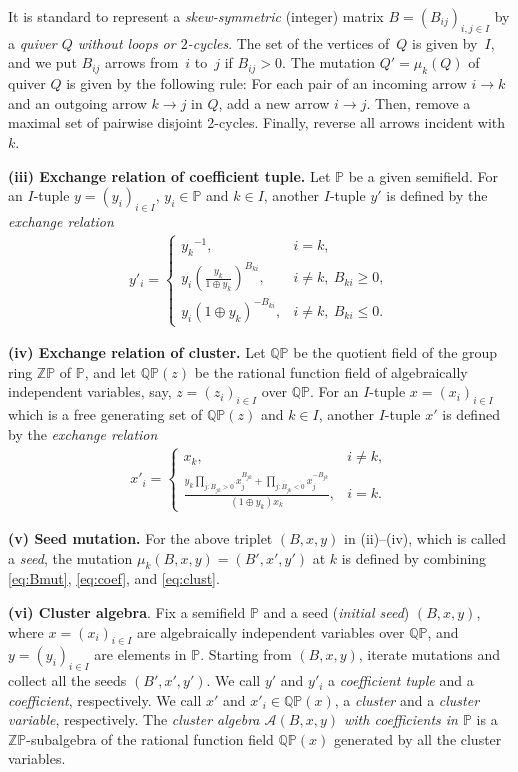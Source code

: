 \documentclass[pdftex]{sigma}
\numberwithin{equation}{section}
\theoremstyle{definition}
\begin{document}
It is standard to represent
a {\em skew-symmetric} (integer) matrix $B=(B_{ij})_{i,j\in I}$
by a {\em quiver $Q$
without loops or $2$-cycles}.
The set of the vertices of~$Q$ is given by~$I$,
and we put $B_{ij}$ arrows from~$i$ to~$j$
if $B_{ij}>0$.
The mutation $Q'=\mu_k(Q)$ of quiver $Q$ is given by the following
rule:
For each pair of an incoming arrow $i\rightarrow k$
and an outgoing arrow $k\rightarrow j$ in $Q$,
add a new arrow $i\rightarrow j$.
Then, remove a maximal set of pairwise disjoint 2-cycles.
Finally, reverse all arrows incident with $k$.

{\bf (iii)  Exchange relation of coef\/f\/icient tuple.}
Let $\mathbb{P}$ be a given semif\/ield.
For an $I$-tuple $y=(y_i)_{i\in I}$, $y_i\in \mathbb{P}$
and $k\in I$, another $I$-tuple $y'$ is def\/ined
by the {\em exchange relation}
\begin{gather}
\label{eq:coef}
y'_i =
\begin{cases}
\displaystyle
{y_k}{}^{-1}, &i=k,\\
\displaystyle
y_i \left(\frac{y_k}{1\oplus {y_k}}\right)^{B_{ki}},&
i\neq k,\ B_{ki}\geq 0,\\
y_i (1\oplus y_k)^{-B_{ki}},&
i\neq k,\ B_{ki}\leq 0.
\end{cases}
\end{gather}

{\bf (iv)   Exchange relation of cluster.}
Let $\mathbb{QP}$ be the  quotient f\/ield of the group ring
$\mathbb{Z}\mathbb{P}$ of $\mathbb{P}$,
 and let $\mathbb{QP}(z)$ be the rational function f\/ield of
algebraically independent variables, say, $z=(z_i)_{i\in I}$
over $\mathbb{QP}$.
For an $I$-tuple $x=(x_i)_{i\in I}$ which
is a free generating set of $\mathbb{QP}(z)$
and $k\in I$, another $I$-tuple $x'$ is def\/ined
by the {\em exchange relation}
\begin{gather}
\label{eq:clust}
x'_i =
\begin{cases}
{x_k}, &i\neq k,\\
\displaystyle
\frac{y_k
\prod\limits_{j: B_{jk}>0} x_j^{B_{jk}}
+
\prod\limits_{j: B_{jk}<0} x_j^{-B_{jk}}
}{(1\oplus y_k)x_k},
&
i= k.
\end{cases}
\end{gather}

{\bf (v)  Seed mutation.} For the above triplet $(B,x,y)$
in (ii)--(iv), which is called a {\em seed},  the mutation
$\mu_k(B,x,y)=(B',x',y')$  at $k$ is def\/ined
 by combining \eqref{eq:Bmut}, \eqref{eq:coef},
and \eqref{eq:clust}.

{\bf (vi)  Cluster algebra}. Fix a semif\/ield $\mathbb{P}$
and a seed ({\em initial seed\/}) $(B,x,y)$, where
$x=(x_i)_{i\in I}$  are algebraically independent variables
over $\mathbb{Q}\mathbb{P}$,
and
$y=(y_i)_{i\in I}$  are elements in $\mathbb{P}$.
Starting from $(B,x,y)$, iterate mutations and collect all the
seeds $(B',x',y')$.
We call  $y'$  and $y'_i$ a {\em coefficient tuple} and
a {\em coefficient}, respectively.
We call  $x'$  and $x'_i\in \mathbb{Q}\mathbb{P}(x)$, a {\em cluster} and
a {\em cluster variable}, respectively.
The {\em cluster algebra $\mathcal{A}(B,x,y)$ with
coefficients in $\mathbb{P}$} is a
$\mathbb{Z}\mathbb{P}$-subalgebra of the
rational function f\/ield $\mathbb{Q}\mathbb{P}(x)$
generated by all the cluster variables.
\end{document}

